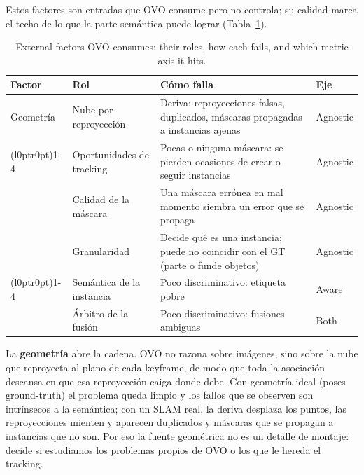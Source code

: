 Estos factores son entradas que OVO consume pero no controla; su calidad marca el techo de lo que la
parte semántica puede lograr (Tabla~\ref{tab:factors_external}).

\begin{table}[t]
  \centering
  \small
  \setlength{\tabcolsep}{10pt}
  \renewcommand{\arraystretch}{1.15}
  \begin{tabular}{@{}l >{\raggedright\arraybackslash}p{3.7cm} >{\raggedright\arraybackslash}p{6.3cm} l@{}}
    \toprule
    \textbf{Factor} & \textbf{Rol} & \textbf{Cómo falla} & \textbf{Eje} \\
    \midrule
    Geometría & Nube por reproyección & Deriva: reproyecciones falsas, duplicados, máscaras propagadas a instancias ajenas & Agnostic \\
    \cmidrule(l{0pt}r{0pt}){1-4}
    \multirow{3}{*}{Segmentador}
      & Oportunidades de tracking & Pocas o ninguna máscara: se pierden ocasiones de crear o seguir instancias & Agnostic \\
      & Calidad de la máscara     & Una máscara errónea en mal momento siembra un error que se propaga & Agnostic \\
      & Granularidad              & Decide qué es una instancia; puede no coincidir con el GT (parte o funde objetos) & Agnostic \\
    \cmidrule(l{0pt}r{0pt}){1-4}
    \multirow{2}{*}{Descriptor}
      & Semántica de la instancia & Poco discriminativo: etiqueta pobre & Aware \\
      & Árbitro de la fusión      & Poco discriminativo: fusiones ambiguas & Both \\
    \bottomrule
  \end{tabular}
  \caption{External factors OVO consumes: their roles, how each fails, and which metric axis it hits.}
  \label{tab:factors_external}
\end{table}

La \textbf{geometría} abre la cadena. OVO no razona sobre imágenes, sino sobre la nube que
reproyecta al plano de cada keyframe, de modo que toda la asociación descansa en que esa
reproyección caiga donde debe. Con geometría ideal (poses ground-truth) el problema queda limpio y
los fallos que se observen son intrínsecos a la semántica; con un SLAM real, la deriva desplaza los
puntos, las reproyecciones mienten y aparecen duplicados y máscaras que se propagan a instancias que
no son. Por eso la fuente geométrica no es un detalle de montaje: decide si estudiamos los problemas
propios de OVO o los que le hereda el tracking.


